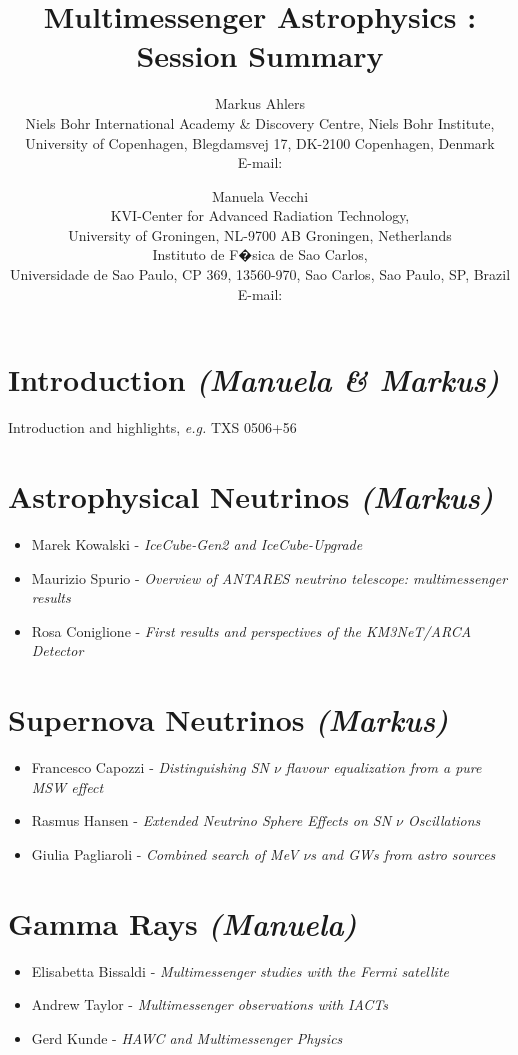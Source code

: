 \documentclass{PoS}
\title{Multimessenger Astrophysics : Session Summary}
\author{Markus Ahlers\\
        Niels Bohr International Academy \& Discovery Centre, Niels Bohr Institute,\\University of Copenhagen, Blegdamsvej 17, DK-2100 Copenhagen, Denmark\\
        E-mail: \email{markus.ahlers@nbi.ku.dk}}
\author{Manuela Vecchi\\
       KVI-Center for Advanced Radiation Technology,\\University of Groningen, NL-9700 AB Groningen, Netherlands\\Instituto de F�sica de Sao Carlos,\\ Universidade de Sao Paulo, CP 369, 13560-970, Sao Carlos, Sao Paulo, SP, Brazil\\
        E-mail: \email{m.vecchi@rug.nl}}
\begin{document}
\section{Introduction {\it (Manuela \& Markus)}}

Introduction and highlights, {\it e.g.} TXS 0506+56~\cite{IceCube:2018cha,IceCube:2018dnn}

\section{Astrophysical Neutrinos {\it (Markus)}}

\begin{itemize}
\item Marek Kowalski - {\it IceCube-Gen2 and IceCube-Upgrade}~\cite{Aartsen:2014njl}
\item Maurizio Spurio - {\it Overview of ANTARES neutrino telescope: multimessenger results }
\item Rosa Coniglione - {\it First results and perspectives of the KM3NeT/ARCA Detector}~\cite{Adrian-Martinez:2016fdl}
\end{itemize}

\section{Supernova Neutrinos {\it (Markus)}}

\begin{itemize}
\item Francesco Capozzi - {\it Distinguishing SN $\nu$ flavour equalization from a pure MSW effect}
\item Rasmus Hansen - {\it Extended Neutrino Sphere Effects on SN $\nu$ Oscillations}
\item Giulia Pagliaroli - {\it Combined search of MeV $\nu$s and GWs from astro sources}
\end{itemize}

\section{Gamma Rays {\it (Manuela)}}

\begin{itemize}
\item Elisabetta Bissaldi - {\it Multimessenger studies with the Fermi satellite}
\item Andrew Taylor - {\it Multimessenger observations with IACTs}
\item Gerd Kunde - {\it HAWC and Multimessenger Physics}
\end{itemize}
\end{document}
